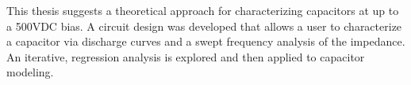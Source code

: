 This thesis suggests a theoretical approach for characterizing capacitors at up to a 500VDC bias. A circuit design was developed that allows a user to characterize a capacitor via discharge curves and a swept frequency analysis of the impedance. An iterative, regression analysis is explored and then applied to capacitor modeling.
\label{sec:abstract}

